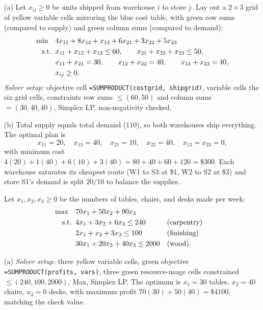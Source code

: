 
(a) Let $x_{ij} \geq 0$ be units shipped from warehouse $i$ to store $j$. Lay out a $2 \times 3$ grid of yellow variable cells mirroring the blue cost table, with green row sums (compared to supply) and green column sums (compared to demand):
\begin{align*}
\min \quad & 4x_{11} + 8x_{12} + x_{13} + 6x_{21} + 3x_{22} + 5x_{23}\\
\text{s.t.}\;\; & x_{11} + x_{12} + x_{13} \leq 60, \qquad x_{21} + x_{22} + x_{23} \leq 50,\\
& x_{11} + x_{21} = 30, \qquad x_{12} + x_{22} = 40, \qquad x_{13} + x_{23} = 40,\\
& x_{ij} \geq 0.
\end{align*}
\emph{Solver setup:} objective cell \texttt{=SUMPRODUCT(costgrid, shipgrid)}, variable cells the six grid cells, constraints row sums $\leq (60, 50)$ and column sums $= (30, 40, 40)$, Simplex LP, non-negativity checked.

(b) Total supply equals total demand ($110$), so both warehouses ship everything. The optimal plan is
\[
x_{11} = 20, \quad x_{13} = 40, \quad x_{21} = 10, \quad x_{22} = 40, \quad x_{12} = x_{23} = 0,
\]
with minimum cost $4(20) + 1(40) + 6(10) + 3(40) = 80 + 40 + 60 + 120 = \$300$. Each warehouse saturates its cheapest route (W1 to S3 at \$1, W2 to S2 at \$3) and store S1's demand is split $20/10$ to balance the supplies.


Let $x_1, x_2, x_3 \geq 0$ be the numbers of tables, chairs, and desks made per week:
\begin{align*}
\max \quad & 70x_1 + 50x_2 + 90x_3\\
\text{s.t.}\;\; & 4x_1 + 3x_2 + 6x_3 \leq 240 && \text{(carpentry)}\\
& 2x_1 + x_2 + 3x_3 \leq 100 && \text{(finishing)}\\
& 30x_1 + 20x_2 + 40x_3 \leq 2000 && \text{(wood)}.
\end{align*}

(a) \emph{Solver setup:} three yellow variable cells, green objective \texttt{=SUMPRODUCT(profits, vars)}, three green resource-usage cells constrained $\leq (240, 100, 2000)$, Max, Simplex LP. The optimum is $x_1 = 30$ tables, $x_2 = 40$ chairs, $x_3 = 0$ desks, with maximum profit $70(30) + 50(40) = \$4100$, matching the check value.

